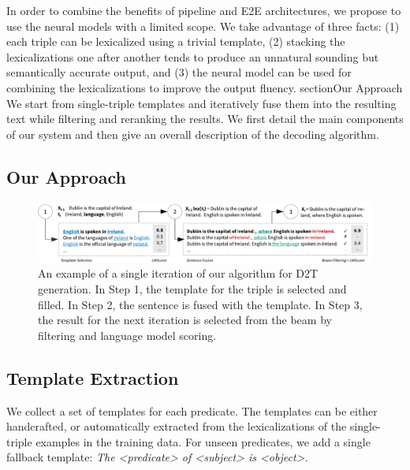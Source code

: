 In order to combine the benefits of pipeline and E2E architectures, we propose to use the neural models with a limited scope. We take advantage of three facts: (1) each triple can be lexicalized using a trivial template, (2) stacking the lexicalizations one after another tends to produce an unnatural sounding but semantically accurate output, and (3) the neural model can be used for combining the lexicalizations to improve the output fluency.
section{Our Approach}
We start from single-triple templates and iteratively fuse them into the resulting text while filtering and reranking the results. We first detail the main components of our system and then give an overall description of the decoding algorithm.
\subsection{Our Approach}
\label{sec:text-editing-exp}


\begin{figure}[t]
    \centering
    \includegraphics[width=\textwidth]{img/d2t_text_editing}
    \caption{An example of a single iteration of our algorithm for D2T generation. In Step 1, the template for the triple is selected and filled. In Step 2, the sentence is fused with the template. In Step 3, the result for the next iteration is selected from the beam by filtering and language model scoring.}\label{fig:iterative:alg}
\end{figure}



\subsection{Template Extraction}
We collect a set of templates for each predicate. The templates can be either handcrafted, or automatically extracted from the lexicalizations of the single-triple examples in the training data. For unseen predicates, we add a single fallback template: \textit{The <predicate> of <subject> is <object>.}


